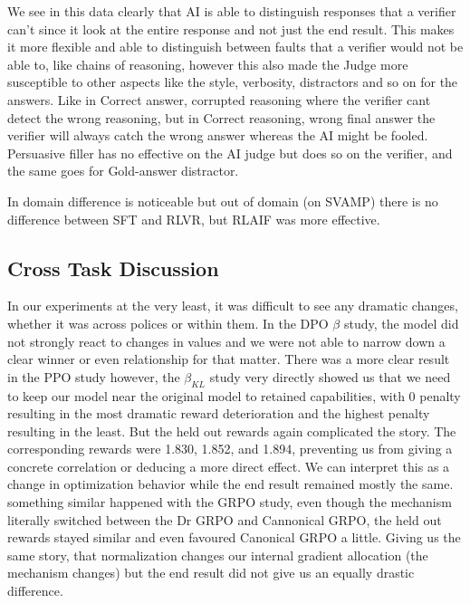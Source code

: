 \documentclass{article}
\begin{document}
We see in this data clearly that AI is able to distinguish responses that a verifier can't since it look at the entire response and not just the end result. This makes it more flexible and able to distinguish between
faults that a verifier would not be able to, like chains of reasoning, however this also made the Judge more susceptible to other aspects like the style, verbosity, distractors and so on for the answers.
Like in Correct answer, corrupted reasoning where the verifier cant detect the wrong reasoning, but in Correct reasoning, wrong final answer the verifier will always catch the wrong answer whereas the AI might be fooled.
Persuasive filler has no effective on the AI judge but does so on the verifier, and the same goes for Gold-answer distractor.

In domain difference is noticeable but out of domain (on SVAMP) there is no difference between SFT and RLVR, but RLAIF was more effective.


\subsection{Cross Task Discussion}

In our experiments at the very least, it was difficult to see any dramatic changes, whether it was across polices or within them.
In the DPO $\beta$ study, the model did not strongly react to changes in values and we were not able to narrow down a clear winner or even relationship for that matter.
There was a more clear result in the PPO study however, the $\beta_{KL}$ study very directly showed us that we need to keep our model near the original model to retained
capabilities, with 0 penalty resulting in the most dramatic reward deterioration and the highest penalty resulting in the least. But the held out rewards again complicated
the story. The corresponding rewards were 1.830, 1.852, and 1.894, preventing us from giving a concrete correlation or deducing a more direct effect. We can interpret this as
a change in optimization behavior while the end result remained mostly the same. something similar happened with the GRPO study, even though the mechanism literally switched between
the Dr GRPO and Cannonical GRPO, the held out rewards stayed similar and even favoured Canonical GRPO a little. Giving us the same story, that normalization changes our internal
gradient allocation (the mechanism changes) but the end result did not give us an equally drastic difference.
\end{document}
